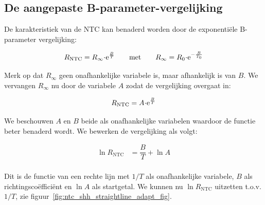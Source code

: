 \documentclass[12pt,a4paper,final,twoside,fleqn]{article}
\newcommand{\rntc}{R_\text{NTC}}
\let\oldcdot\cdot
\renewcommand{\cdot}{\kern-.10em\oldcdot\kern-.10em}
\begin{document}
\subsection{De aangepaste B-parameter-vergelijking}
De karakteristiek van de NTC kan benaderd worden door de exponenti\"ele
B-parameter vergelijking:

\begin{equation}
R_\text{NTC} = R_\infty \cdot\text{e}^\frac{B}{T} \qquad \text{met} \qquad R_\infty = R_0\cdot \text{e}^{-\frac{B}{T_0}}
\end{equation}

Merk op dat $R_\infty$ geen onafhankelijke variabele is, maar afhankelijk is van $B$.
We vervangen $R_\infty$ nu door de variabele $A$ zodat de vergelijking overgaat in:

\begin{equation}
\label{equ:betafuncexpAB}
R_\text{NTC} = A \cdot\text{e}^\frac{B}{T}
\end{equation}

We beschouwen $A$ en $B$ beide als onafhankelijke variabelen waardoor de functie beter
benaderd wordt. We bewerken de vergelijking als volgt:

\begin{equation}
\begin{split}
\ln \rntc &= \dfrac{B}{T} + \ln A \\
\end{split}
\end{equation}

Dit is de functie van een rechte lijn met $1/T$ als onafhankelijke variabele, $B$
als richtingsco\"effici\"ent en $\ln A$ als startgetal.
We kunnen nu $\ln \rntc$ uitzetten t.o.v.\@ $1/T$, zie
figuur~\ref{fig:ntc_shh_straightline_adapt_fig}.
\end{document}
